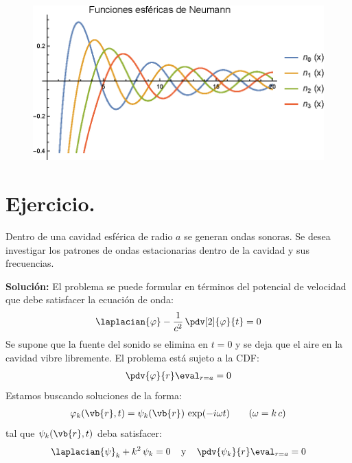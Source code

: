 \begin{figure}[H]
    \centering
    \includegraphics[scale=1]{Imagenes/Plot_Esfericas_Neumann.eps}
\end{figure}

\section{Ejercicio.}

Dentro de una cavidad esférica de radio $a$ se generan ondas sonoras. Se desea investigar los patrones de ondas estacionarias dentro de la cavidad y sus frecuencias.
\par
\noindent
\textbf{Solución: } El problema se puede formular en términos del potencial de velocidad que debe satisfacer la ecuación de onda:
\begin{align*}
\laplacian{\varphi} - \dfrac{1}{c^{2}} \, \pdv[2]{\varphi}{t} = 0
\end{align*}
Se supone que la fuente del sonido se elimina en $t = 0$ y se deja que el aire en la cavidad vibre libremente. El problema está sujeto a la CDF:
\begin{align*}
\pdv{\varphi}{r} \eval_{r = a} = 0
\end{align*}
Estamos buscando soluciones de la forma:
\begin{align*}
\varphi_{k} (\vb{r},  t) = \psi_{k} (\vb{r}) \, \exp(-i \omega t) \hspace{0.7cm} (\omega = k \, c)
\end{align*}
tal que $\psi_{k} (\vb{r},  t)$ deba satisfacer:
\begin{align*}
\laplacian{\psi}_{k} + k^{2} \, \psi_{k} = 0 \hspace{0.4cm} \mbox{y} \hspace{0.4cm} \pdv{\psi_{k}}{r} \eval_{r = a} = 0 
\end{align*}

